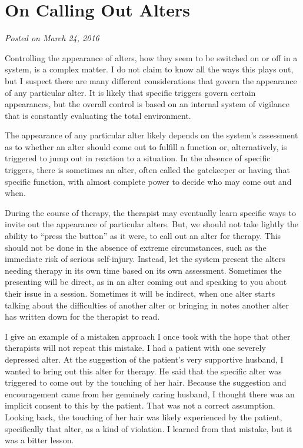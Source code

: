 \documentclass[]{book}
\begin{document}
\hypertarget{on-calling-out-alters}{%
\section{On Calling Out Alters}\label{on-calling-out-alters}}

\emph{Posted on March 24, 2016}

Controlling the appearance of alters, how they seem to be switched on or off in a system, is a complex matter. I do not claim to know all the ways this plays out, but I suspect there are many different considerations that govern the appearance of any particular alter. It is likely that specific triggers govern certain appearances, but the overall control is based on an internal system of vigilance that is constantly evaluating the total environment.

The appearance of any particular alter likely depends on the system's assessment as to whether an alter should come out to fulfill a function or, alternatively, is triggered to jump out in reaction to a situation. In the absence of specific triggers, there is sometimes an alter, often called the gatekeeper or having that specific function, with almost complete power to decide who may come out and when.

During the course of therapy, the therapist may eventually learn specific ways to invite out the appearance of particular alters. But, we should not take lightly the ability to ``press the button'' as it were, to call out an alter for therapy. This should not be done in the absence of extreme circumstances, such as the immediate risk of serious self-injury. Instead, let the system present the alters needing therapy in its own time based on its own assessment. Sometimes the presenting will be direct, as in an alter coming out and speaking to you about their issue in a session. Sometimes it will be indirect, when one alter starts talking about the difficulties of another alter or bringing in notes another alter has written down for the therapist to read.

I give an example of a mistaken approach I once took with the hope that other therapists will not repeat this mistake. I had a patient with one severely depressed alter. At the suggestion of the patient's very supportive husband, I wanted to bring out this alter for therapy. He said that the specific alter was triggered to come out by the touching of her hair. Because the suggestion and encouragement came from her genuinely caring husband, I thought there was an implicit consent to this by the patient. That was not a correct assumption. Looking back, the touching of her hair was likely experienced by the patient, specifically that alter, as a kind of violation. I learned from that mistake, but it was a bitter lesson.
\end{document}
